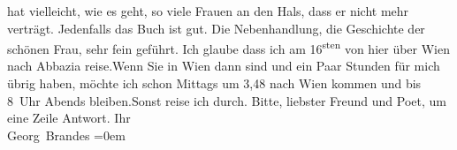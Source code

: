 \begin{ledgroupsized}[t]{13cm}
                    hat vielleicht, wie es geht, so viele Frauen an den Hals, dass er nicht mehr
                    verträgt. Jedenfalls {\pb}das Buch ist gut. Die
                    Nebenhandlung, die Geschichte der schönen Frau, sehr fein geführt.\pend
           \pstart
           Ich glaube dass ich am 16\textsuperscript{sten} von hier über Wien nach Abbazia reise.\hspace*{1.5em}Wenn Sie in Wien dann sind
                    und ein Paar Stunden für mich übrig haben, möchte ich schon Mittags um
                        3,48 nach Wien kommen und bis
                        8 Uhr Abends bleiben.\hspace*{1.5em}Sonst
                    reise ich durch.\pend
           \pstart
           Bitte, liebster Freund und Poet, um eine Zeile Antwort.\pend
           \pstart
           Ihr{\\[\baselineskip]}\spacefill\mbox{Georg Brandes}\pend
           \leftskip=0em{}          \endnumbering{}\end{ledgroupsized}  \newcommand{\dateiname}{L01116}\newcommand{\titel}{Georg Brandes an Arthur Schnitzler, 10. 5. [1901]}\newcommand{\editorInnen}{Martin Anton Müller und Gerd-Hermann Susen}
            \footnotesize
\begin{ledgroupsized}[t]{11.5cm}
\end{ledgroupsized}
         
      